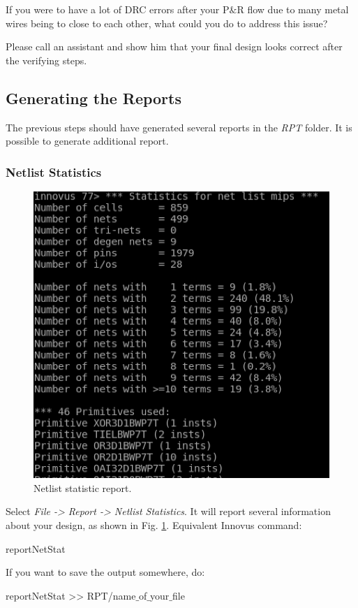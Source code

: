 \begin{exercise}
	If you were to have a lot of DRC errors after your P$\&$R flow due to many metal wires being to close to each other, what could you do to address this issue?
\end{exercise}

\begin{checkpoint}\label{check2}
	Please call an assistant and show him that your final design looks correct after the verifying steps.
\end{checkpoint}

\subsection{Generating the Reports}
The previous steps should have generated several reports in the \textit{RPT} folder. It is possible to generate additional report.
\subsubsection{Netlist Statistics}

	\parbox[t]{\dimexpr\textwidth-\leftmargin}{%
	\begin{figure}
		\vspace{-10mm}
		\centering
		\vspace{-\baselineskip}
	\includegraphics[scale=0.45]{figures/lab5_backend/netlist_stat}
\caption{Netlist statistic report.}
\label{netlist_stat}
	\end{figure}

Select \textit{File -> Report -> Netlist Statistics}. It will report several information about your design, as shown in Fig. \ref{netlist_stat}. Equivalent Innovus command:
\begin{codeline}
	reportNetStat
\end{codeline}
If you want to save the output somewhere, do:
\begin{codeline}
	reportNetStat >> RPT/name$\_$of$\_$your$\_$file
\end{codeline}
} 

